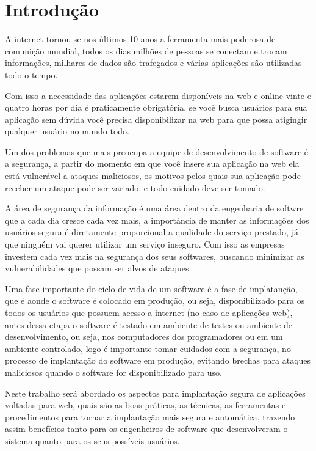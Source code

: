 \chapter{Introdução}
\label{cap-introducao}

A internet tornou-se nos últimos 10 anos a ferramenta mais poderosa de comunição
mundial, todos os dias milhões de pessoas se conectam e trocam informações,
milhares de dados são trafegados e várias aplicações são utilizadas todo o tempo.

Com isso a necessidade das aplicações estarem disponíveis na web e online vinte e
quatro horas por dia é praticamente obrigatória, se você busca usuários para sua
aplicação sem dúvida você precisa disponibilizar na web para que possa atigingir
qualquer usuário no mundo todo.

Um dos problemas que mais preocupa a equipe de desenvolvimento de software é a
segurança, a partir do momento em que você insere sua aplicação na web ela está
vulnerável a ataques maliciosos, os motivos pelos quais sua aplicação pode receber
um ataque pode ser variado, e todo cuidado deve ser tomado.

A área de segurança da informação é uma área dentro da engenharia de softwre que
a cada dia cresce cada vez mais, a importância de manter as informações dos usuários
segura é diretamente proporcional a qualidade do serviço prestado, já que ninguém
vai querer utilizar um serviço inseguro. Com isso as empresas investem cada vez
mais na segurança dos seus softwares, buscando minimizar as vulnerabilidades que
possam ser alvos de ataques.

Uma fase importante do ciclo de vida de um software é a fase de implatanção, que
é aonde o software é colocado em produção, ou seja, disponibilizado para os
todos os usuários que possuem acesso a internet (no caso de aplicações web), antes
dessa etapa o software é testado em ambiente de testes ou ambiente de desenvolvimento,
ou seja, nos computadores dos programadores ou em um ambiente controlado, logo é
importante tomar cuidados com a segurança, no processo de implantação do
software em produção, evitando brechas para ataques maliciosos quando o software
for disponibilizado para uso.

Neste trabalho será abordado os aspectos para implantação segura de aplicações
voltadas para web, quais são as boas práticas, as técnicas, as ferramentas e
procedimentos para tornar a implantação mais segura e automática, trazendo assim
benefícios tanto para os engenheiros de software que desenvolveram o sistema
quanto para os seus possíveis usuários.

